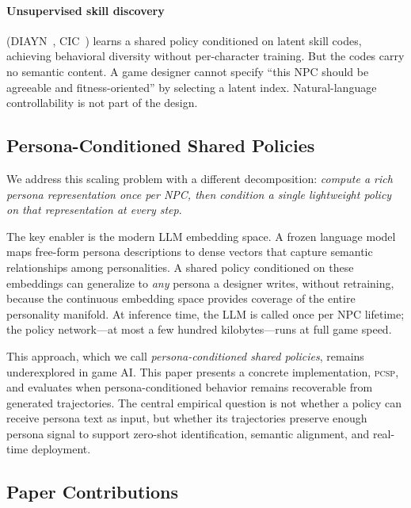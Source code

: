 \documentclass[conference]{IEEEtran}
\newcommand{\PCSP}{\textsc{pcsp}\xspace}
\begin{document}
\paragraph{Unsupervised skill discovery} (DIAYN~\cite{eysenbach2018diayn},
CIC~\cite{laskin2022cic}) learns a shared policy conditioned on latent skill codes,
achieving behavioral diversity without per-character training. But the codes carry
no semantic content. A game designer cannot specify ``this NPC should be agreeable
and fitness-oriented'' by selecting a latent index.
Natural-language controllability is not part of the design.

\subsection{Persona-Conditioned Shared Policies}

We address this scaling problem with a different decomposition: \emph{compute a
rich persona representation once per NPC, then condition a single lightweight
policy on that representation at every step}.

The key enabler is the modern LLM embedding space. A frozen language model maps
free-form persona descriptions to dense vectors that capture semantic
relationships among personalities. A shared policy conditioned on these
embeddings can generalize to \emph{any} persona a designer writes, without
retraining, because the continuous embedding space provides coverage of the
entire personality manifold. At inference time, the LLM is called once per NPC
lifetime; the policy network---at most a few hundred kilobytes---runs at full
game speed.

This approach, which we call \emph{persona-conditioned shared
policies}, remains underexplored in game AI. This paper presents a concrete
implementation, \PCSP, and evaluates when persona-conditioned behavior remains
recoverable from generated trajectories. The central empirical question is not
whether a policy can receive persona text as input, but whether its trajectories
preserve enough persona signal to support zero-shot identification, semantic
alignment, and real-time deployment.

\subsection{Paper Contributions}
\end{document}
